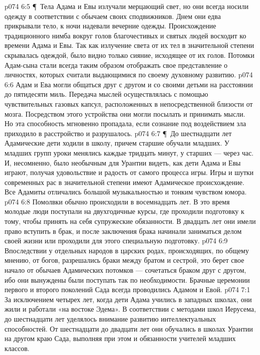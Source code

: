 \vs p074 6:5 \P\ Тела Адама и Евы излучали мерцающий свет, но они всегда носили одежду в соответствии с обычаем своих сподвижников. Днем они едва прикрывали тело, к ночи надевали вечерние одежды. Происхождение традиционного нимба вокруг голов благочестивых и святых людей восходит ко времени Адама и Евы. Так как излучение света от их тел в значительной степени скрывалась одеждой, было видно только сияние, исходящее от их голов. Потомки Адам\hyp{}сына стали всегда таким образом отображать свое представление о личностях, которых считали выдающимися по своему духовному развитию.
\vs p074 6:6 Адам и Ева могли общаться друг с другом и со своими детьми на расстоянии до пятидесяти миль. Передача мыслей осуществлялась с помощью чувствительных газовых капсул, расположенных в непосредственной близости от мозга. Посредством этого устройства они могли посылать и принимать мысли. Но эта способность мгновенно пропадала, если сознание под воздействием зла приходило в расстройство и разрушалось.
\vs p074 6:7 \P\ До шестнадцати лет Адамические дети ходили в школу, причем старшие обучали младших. У младших групп уроки менялись каждые тридцать минут, у старших --- через час. И, несомненно, было необычным для Урантии видеть, как дети Адама и Евы играют, получая удовольствие и радость от самого процесса игры. Игры и шутки современных рас в значительной степени имеют Адамическое происхождение. Все Адамиты отличались большой музыкальностью и тонким чувством юмора.
\vs p074 6:8 Помолвки обычно происходили в восемнадцать лет. В это время молодые люди поступали на двухгодичные курсы, где проходили подготовку к тому, чтобы принять на себя супружеские обязанности. В двадцать лет они имели право вступить в брак, и после заключения брака начинали заниматься делом своей жизни или проходили для этого специальную подготовку.
\vs p074 6:9 Впоследствии у отдельных народов в царских родах, происходящих, по общему мнению, от богов, разрешались браки между братом и сестрой, это берет свое начало от обычаев Адамических потомков --- сочетаться браком друг с другом, ибо они вынуждены были поступать так по необходимости. Брачные церемонии первого и второго поколений Сада всегда проводились Адамом и Евой.
\vs p074 7:1 За исключением четырех лет, когда дети Адама учились в западных школах, они жили и работали «на востоке Эдема». В соответствии с методами школ Иерусема, до шестнадцати лет уделялось внимание развитию интеллектуальных способностей. От шестнадцати до двадцати лет они обучались в школах Урантии на другом краю Сада, выполняя при этом и обязанности учителей младших классов.
